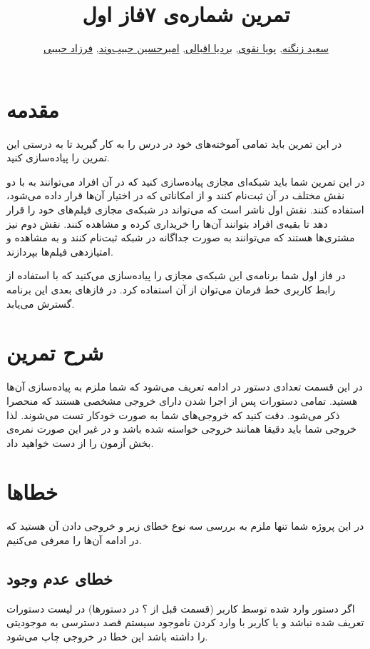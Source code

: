 \documentclass{utap}
\title{تمرین شماره‌ی ۷\normalsize\qquad فاز اول}
\author{%
	\href{mailto:zangenehsaeed412@gmail.com?subject=[AP\%20S98\%20A7]\%20}{سعید زنگنه},
	\href{mailto:naghavi.pooya@gmail.com?subject=[AP\%20S98\%20A7]\%20}{پویا نقوی},
	\href{mailto:bardia.eghbali@gmail.com?subject=[AP\%20S98\%20A7]\%20}{بردیا اقبالی},
	\href{mailto:ahhabibvand@gmail.com?subject=[AP\%20S98\%20A7]\%20}{امیرحسین حبیب‌وند},
	\href{mailto:farzadhabibii98@gmail.com?subject=[AP\%20S98\%20A7]\%20}{فرزاد حبیبی}
}
\begin{document}
	\maketitle
	\section*{مقدمه}
		در این تمرین باید تمامی آموختەهای خود در درس را به کار گیرید تا به درستی این تمرین را پیادەسازی کنید. 
		
		در این تمرین شما باید شبکه‌ای مجازی پیاده‌سازی کنید که در آن افراد می‌توانند به با دو نقش مختلف در آن ثبت‌نام کنند و از امکاناتی که در اختیار آن‌ها قرار داده می‌شود، استفاده کنند. نقش اول ناشر است که می‌تواند در شبکه‌ی مجازی فیلم‌های خود را قرار دهد تا بقیه‌ی افراد بتوانند آن‌ها را خریداری کرده و مشاهده کنند. نقش دوم نیز مشتری‌ها هستند که می‌توانند به صورت جداگانه در شبکه ثبت‌نام کنند و به مشاهده‌ و امتیازدهی فیلم‌ها بپردازند.
		
		در فاز اول شما برنامەی این شبکه‌ی مجازی را پیادەسازی می‌کنید که با استفاده از رابط‌ کاربری خط فرمان می‌توان از آن استفاده کرد. در فازهای بعدی این برنامه گسترش می‌یابد.


	\section{شرح تمرین}
	در این قسمت تعدادی دستور در ادامه تعریف می‌شود که شما ملزم به پیاده‌سازی آن‌ها هستید. تمامی دستورات پس از اجرا شدن دارای خروجی مشخصی هستند که منحصرا ذکر می‌شود. دقت کنید که خروجی‌های شما به صورت خودکار تست می‌شوند. لذا خروجی شما باید دقیقا همانند خروجی خواسته شده باشد و در غیر این صورت نمره‌ی بخش آزمون
	را از دست خواهید داد.

	\section{خطاها}
	
	در این پروژه شما تنها ملزم به بررسی سه نوع خطای زیر و خروجی دادن آن هستید که در ادامه آن‌ها را معرفی می‌کنیم.
	
	\subsection{خطای عدم وجود}
	
	اگر دستور وارد شده توسط کاربر (قسمت قبل از ؟ در دستورها) در لیست دستورات تعریف شده نباشد و یا کاربر با وارد کردن  ناموجود سیستم قصد دسترسی به موجودیتی را داشته باشد این خطا در خروجی چاپ می‌شود.
	
\end{document}
